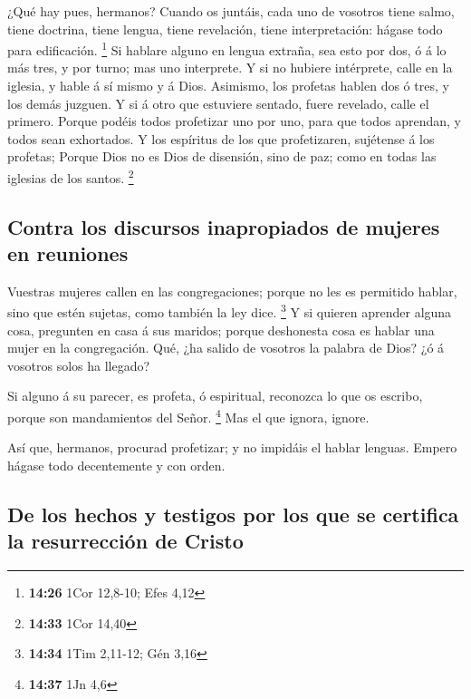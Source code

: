  ¿Qué hay pues, hermanos? Cuando os juntáis, cada uno de
vosotros tiene salmo, tiene doctrina, tiene lengua, tiene revelación,
tiene interpretación: hágase todo para edificación. \footnote{\textbf{14:26}
  1Cor 12,8-10; Efes 4,12}  Si hablare alguno en lengua
extraña, sea esto por dos, ó á lo más tres, y por turno; mas uno
interprete.  Y si no hubiere intérprete, calle en la
iglesia, y hable á sí mismo y á Dios.  Asimismo, los
profetas hablen dos ó tres, y los demás juzguen.  Y si á
otro que estuviere sentado, fuere revelado, calle el primero.
 Porque podéis todos profetizar uno por uno, para que
todos aprendan, y todos sean exhortados.  Y los espíritus
de los que profetizaren, sujétense á los profetas; 
Porque Dios no es Dios de disensión, sino de paz; como en todas las
iglesias de los santos. \footnote{\textbf{14:33} 1Cor 14,40}

\hypertarget{contra-los-discursos-inapropiados-de-mujeres-en-reuniones}{%
\subsection{Contra los discursos inapropiados de mujeres en
reuniones}\label{contra-los-discursos-inapropiados-de-mujeres-en-reuniones}}

 Vuestras mujeres callen en las congregaciones; porque no
les es permitido hablar, sino que estén sujetas, como también la ley
dice. \footnote{\textbf{14:34} 1Tim 2,11-12; Gén 3,16}  Y
si quieren aprender alguna cosa, pregunten en casa á sus maridos; porque
deshonesta cosa es hablar una mujer en la congregación. 
Qué, ¿ha salido de vosotros la palabra de Dios? ¿ó á vosotros solos ha
llegado?

 Si alguno á su parecer, es profeta, ó espiritual,
reconozca lo que os escribo, porque son mandamientos del Señor.
\footnote{\textbf{14:37} 1Jn 4,6}  Mas el que ignora,
ignore.

 Así que, hermanos, procurad profetizar; y no impidáis el
hablar lenguas.  Empero hágase todo decentemente y con
orden.

\hypertarget{de-los-hechos-y-testigos-por-los-que-se-certifica-la-resurrecciuxf3n-de-cristo}{%
\subsection{De los hechos y testigos por los que se certifica la
resurrección de
Cristo}\label{de-los-hechos-y-testigos-por-los-que-se-certifica-la-resurrecciuxf3n-de-cristo}}

